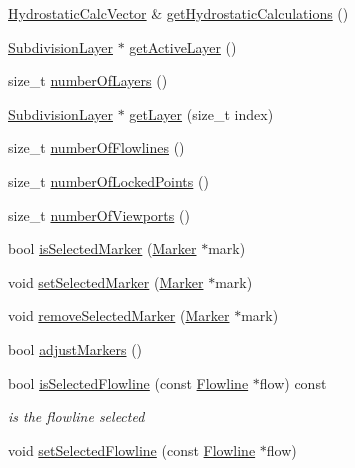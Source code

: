 \begin{DoxyCompactItemize}
\hyperlink{namespaceShipCAD_a0c7b012d8868cbb43871cf0bf303ccc6}{Hydrostatic\-Calc\-Vector} \& \hyperlink{classShipCAD_1_1ShipCADModel_aafc30dd7d6b9db4ccfc7bf1c4e2b3b11}{get\-Hydrostatic\-Calculations} ()
\item 
\hyperlink{classShipCAD_1_1SubdivisionLayer}{Subdivision\-Layer} $\ast$ \hyperlink{classShipCAD_1_1ShipCADModel_a5aa1e9aa14350f2e0980112a81613ca6}{get\-Active\-Layer} ()
\item 
size\-\_\-t \hyperlink{classShipCAD_1_1ShipCADModel_afb23b08b1014fc176ff864b8f154a84b}{number\-Of\-Layers} ()
\item 
\hyperlink{classShipCAD_1_1SubdivisionLayer}{Subdivision\-Layer} $\ast$ \hyperlink{classShipCAD_1_1ShipCADModel_ae13e425deb59f7b4f0c95cc02230f097}{get\-Layer} (size\-\_\-t index)
\item 
size\-\_\-t \hyperlink{classShipCAD_1_1ShipCADModel_afdb9bccb1cf9e3bf8aa853d81ff11d39}{number\-Of\-Flowlines} ()
\item 
size\-\_\-t \hyperlink{classShipCAD_1_1ShipCADModel_afb8cc5aaf19a6c1c687550fd9de1739e}{number\-Of\-Locked\-Points} ()
\item 
size\-\_\-t \hyperlink{classShipCAD_1_1ShipCADModel_a099d0530e99261318f6332220a331010}{number\-Of\-Viewports} ()
\item 
bool \hyperlink{classShipCAD_1_1ShipCADModel_ada688a626562a513c03f0a19c6233eae}{is\-Selected\-Marker} (\hyperlink{classShipCAD_1_1Marker}{Marker} $\ast$mark)
\item 
void \hyperlink{classShipCAD_1_1ShipCADModel_afd7e984f4070d08cb16264c1b731580f}{set\-Selected\-Marker} (\hyperlink{classShipCAD_1_1Marker}{Marker} $\ast$mark)
\item 
void \hyperlink{classShipCAD_1_1ShipCADModel_a7fb06b0a1fa75ef02597752fc3f691a2}{remove\-Selected\-Marker} (\hyperlink{classShipCAD_1_1Marker}{Marker} $\ast$mark)
\item 
bool \hyperlink{classShipCAD_1_1ShipCADModel_a64493dfc69513b4d9425e3736e41b596}{adjust\-Markers} ()
\item 
bool \hyperlink{classShipCAD_1_1ShipCADModel_a9276e43cb3f7917782f91a7cf3faa215}{is\-Selected\-Flowline} (const \hyperlink{classShipCAD_1_1Flowline}{Flowline} $\ast$flow) const 
\begin{DoxyCompactList}\small\item\em is the flowline selected \end{DoxyCompactList}\item 
void \hyperlink{classShipCAD_1_1ShipCADModel_af61065a1e9050cff7cb91c8312082e2a}{set\-Selected\-Flowline} (const \hyperlink{classShipCAD_1_1Flowline}{Flowline} $\ast$flow)

\end{DoxyCompactItemize}

